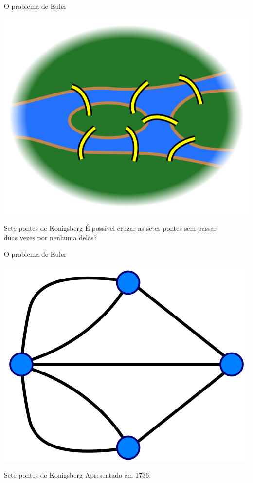 \documentclass[xcolor=dvipsnames,table]{beamer}
\begin{document}
	\begin{frame}[shrink]{O problema de Euler}
		\begin{center}
    		\includegraphics[height=.6\textheight]{images/konigsberg2.png}
  		\end{center} 
		\begin{alertblock}{Sete pontes de Konigsberg} 
			É possível cruzar as setes pontes sem passar \\
			duas vezes por nenhuma delas?
		\end{alertblock}
	\end{frame}
	
	\begin{frame}{O problema de Euler}
		\begin{center}
    		\includegraphics[height=.6\textheight]{images/konigsberg3.png}
  		\end{center} 
		\begin{block}{Sete pontes de Konigsberg} \pause
			Apresentado em 1736.
		\end{block}
	\end{frame}
	
\end{document}
